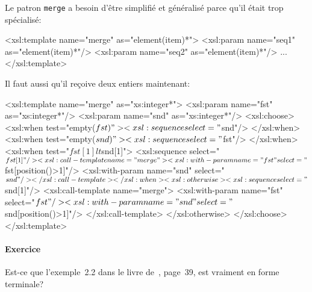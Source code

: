 Le patron \texttt{merge} a besoin d'être simplifié et généralisé parce
qu'il était trop spécialisé:
\begin{sverb}
  <xsl:template name="merge" as="element(item)*">
    <xsl:param name="seq1" as="element(item)*"/>
    <xsl:param name="seq2" as="element(item)*"/>
    ...
  </xsl:template>
\end{sverb}
Il faut aussi qu'il reçoive deux entiers maintenant:
\begin{sverb}
  <xsl:template name="merge" as="xs:integer*">
    <xsl:param name="fst" as="xs:integer*"/>
    <xsl:param name="snd" as="xs:integer*"/>
    <xsl:choose>
      <xsl:when test="empty($fst)">
        <xsl:sequence select="$snd"/>
      </xsl:when>
      <xsl:when test="empty($snd)">
        <xsl:sequence select="$fst"/>
      </xsl:when>
      <xsl:when test="$fst[1] lt $snd[1]">
        <xsl:sequence select="$fst[1]"/>
        <xsl:call-template name="merge">
          <xsl:with-param name="fst"
                          select="$fst[position()>1]"/>
          <xsl:with-param name="snd" select="$snd"/>
        </xsl:call-template>
      </xsl:when>
      <xsl:otherwise>
        <xsl:sequence select="$snd[1]"/>
        <xsl:call-template name="merge">
          <xsl:with-param name="fst" select="$fst"/>
          <xsl:with-param name="snd"
                          select="$snd[position()>1]"/>
        </xsl:call-template>
      </xsl:otherwise>
    </xsl:choose>
  </xsl:template>
\end{sverb}

\paragraph{Exercice}

Est-ce que l'exemple~2.2 dans le livre de~\cite{Mangano_2006},
page~39, est vraiment en forme terminale?

